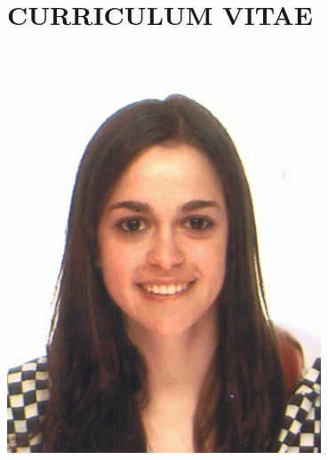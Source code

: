 \documentclass[10pt,a4paper,notitlepage]{article}
\author{Nerea Gonzalez Cordero}
\begin{document}

\noindent
\begin{minipage}[t]{0.75\textwidth}
	\vspace{0pt}
	\section*{CURRICULUM VITAE}
\end{minipage}
\begin{minipage}[t]{0.25\textwidth}
	\vspace{-20pt}
	\includegraphics[width=0.7\textwidth]{fotocarnet.jpg}
\end{minipage}
\end{document}
